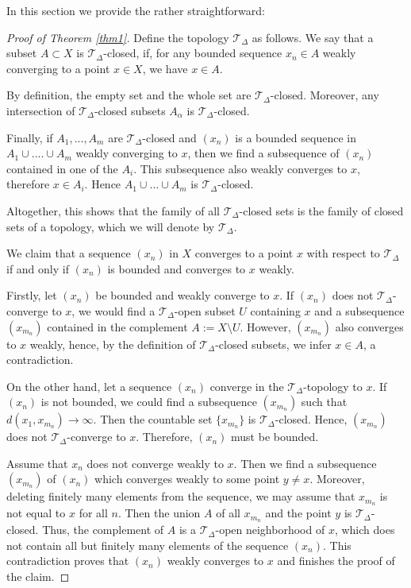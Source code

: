 \documentclass[12pt,leqno]{amsart}
\numberwithin{equation}{section}
\theoremstyle{remark}
\begin{document}
In this section we provide the rather straightforward:
\begin{proof}[Proof of Theorem \ref{thm1}]
Define the topology $\mathcal T_{\Delta}$ as follows. We say that a subset $A\subset X$ is $\mathcal T_{\Delta}$-closed, if, for any bounded sequence $x_n \in A$ weakly converging to a point $x\in X$,
we have $x\in A$. 

By definition, the empty set and the whole set are $\mathcal T_{\Delta}$-closed. Moreover,
any intersection of $\mathcal T_{\Delta}$-closed subsets $A_{\alpha}$ is 
$\mathcal T_{\Delta}$-closed. 

Finally, if $A_1,...,A_m$ are $\mathcal T_{\Delta}$-closed and $(x_n)$ is a bounded sequence in $A_1\cup.... \cup A_m$ weakly converging to $x$, then we find a subsequence of $(x_n)$ contained in one of the $A_i$. This subsequence also weakly converges to $x$, therefore $x\in A_i$. Hence $A_1\cup...\cup A_m$ is $\mathcal T_{\Delta}$-closed.

Altogether, this shows that the family of all $\mathcal T_{\Delta}$-closed sets is the family of closed sets of a topology, which we will denote by $\mathcal T_{\Delta}$.

We claim that a sequence $(x_n)$ in $X$ converges to a point $x$ with respect to $\mathcal T_{\Delta}$ if and only if $(x_n)$ is bounded and converges to $x$ weakly.

Firstly, let $(x_n)$ be bounded and weakly converge to $x$. If $(x_n)$ does not $\mathcal T _{\Delta}$-converge to $x$, we would find a $\mathcal T_{\Delta}$-open subset $U$ containing $x$ and a subsequence $(x_{m_n})$ contained in the complement $A\mathrel{:=}X\setminus U$.
However, $(x_{m_n})$
also converges to $x$ weakly, hence, by the definition of $\mathcal T_{\Delta}$-closed subsets, we infer $x\in A$, a contradiction.

On the other hand, let a sequence $(x_n)$ converge in the $\mathcal T_{\Delta}$-topology to $x$. If $(x_n)$ is not bounded, we could find a subsequence $(x_{m_n})$ such that $d(x_1,x_{m_n}) \to \infty$. Then the countable set $\{x_{m_n} \}$ is $\mathcal T_{\Delta}$-closed. Hence, $(x_{m_n})$ does not $\mathcal T_{\Delta}$-converge to $x$. Therefore, $(x_n)$ must be bounded.

Assume that $x_n$ does not converge weakly to $x$. Then we find a subsequence
$(x_{m_n})$ of $(x_n)$ which converges weakly to some point $y\neq x$. Moreover, deleting finitely many elements from the sequence, we may assume that $x_{m_n}$ is not equal to $x$ for all $n$.
Then the union $A$ of all
$x_{m_n}$ and the point $y$ is $\mathcal T_{\Delta}$-closed. Thus, the complement of $A$ is a $\mathcal T_{\Delta}$-open neighborhood of $x$, which does not contain all but finitely many elements of the sequence $(x_n)$. This contradiction proves that $(x_n)$ weakly converges to $x$ and finishes the proof of the claim. 


\end{proof}
\end{document}
